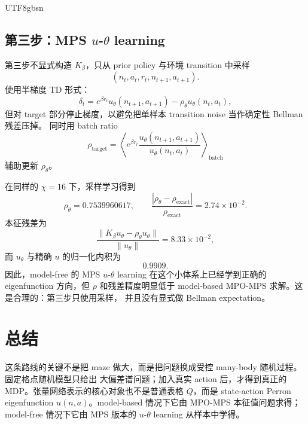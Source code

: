 \documentclass[11pt]{article}
\begin{document}
\begin{CJK*}{UTF8}{gbsn}
\subsection{\texorpdfstring{第三步：MPS \(u\)-\(\theta\) learning}{第三步：MPS u-theta learning}}

第三步不显式构造 \(K_\beta\)，只从 prior policy 与环境 transition 中采样
\begin{equation}
    (n_t,a_t,r_t,n_{t+1},a_{t+1}).
\end{equation}
使用半梯度 TD 形式：
\begin{equation}
    \delta_t
    =
    e^{\beta r_t}
    u_\theta(n_{t+1},a_{t+1})
    -
    \rho_\theta u_\theta(n_t,a_t),
\end{equation}
但对 target 部分停止梯度，以避免把单样本 transition noise 当作确定性 Bellman 残差压掉。
同时用 batch ratio
\begin{equation}
    \rho_{\mathrm{target}}
    =
    \left\langle
        e^{\beta r_t}
        \frac{u_\theta(n_{t+1},a_{t+1})}
        {u_\theta(n_t,a_t)}
    \right\rangle_{\mathrm{batch}}
\end{equation}
辅助更新 \(\rho_\theta\)。

在同样的 \(\chi=16\) 下，采样学习得到
\begin{equation}
    \rho_{\theta}=0.7539960617,
    \qquad
    \frac{|\rho_\theta-\rho_{\mathrm{exact}}|}{\rho_{\mathrm{exact}}}
    =
    2.74\times 10^{-2}.
\end{equation}
本征残差为
\begin{equation}
    \frac{\|K_\beta u_\theta-\rho_\theta u_\theta\|}{\|u_\theta\|}
    =
    8.33\times 10^{-2},
\end{equation}
而 \(u_\theta\) 与精确 \(u\) 的归一化内积为
\begin{equation}
    0.9909.
\end{equation}
因此，model-free 的 MPS \(u\)-\(\theta\) learning 在这个小体系上已经学到正确的 eigenfunction
方向，但 \(\rho\) 和残差精度明显低于 model-based MPO-MPS 求解。这是合理的：第三步只使用采样，
并且没有显式做 Bellman expectation。

\section{总结}

这条路线的关键不是把 maze 做大，而是把问题换成受控 many-body 随机过程。固定格点随机模型只给出
大偏差谱问题；加入真实 action 后，才得到真正的 MDP。张量网络表示的核心对象也不是普通表格
\(Q\)，而是 state-action Perron eigenfunction \(u(n,a)\)。model-based 情况下它由 MPO-MPS
本征值问题求得；model-free 情况下它由 MPS 版本的 \(u\)-\(\theta\) learning 从样本中学得。

\end{CJK*}
\end{document}
